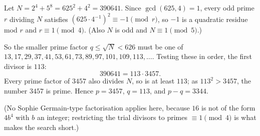 Let $N=2^4+5^8=625^2+4^2=390641$. Since $\gcd(625,4)=1$, every odd prime $r$ dividing $N$ satisfies $\left(625\cdot4^{-1}\right)^2\equiv-1\pmod r$, so $-1$ is a quadratic residue mod $r$ and $r\equiv1\pmod4$. (Also $N$ is odd and $N\equiv1\pmod5$.)

So the smaller prime factor $q\le\sqrt N<626$ must be one of $13,17,29,37,41,53,61,73,89,97,101,109,113,\dots$. Testing these in order, the first divisor is $113$:
\[390641=113\cdot3457.\]
Every prime factor of $3457$ also divides $N$, so is at least $113$; as $113^2>3457$, the number $3457$ is prime. Hence $p=3457$, $q=113$, and $p-q=\boxed{3344}$.

(No Sophie Germain-type factorisation applies here, because $16$ is not of the form $4b^4$ with $b$ an integer; restricting the trial divisors to primes $\equiv1\pmod4$ is what makes the search short.)
